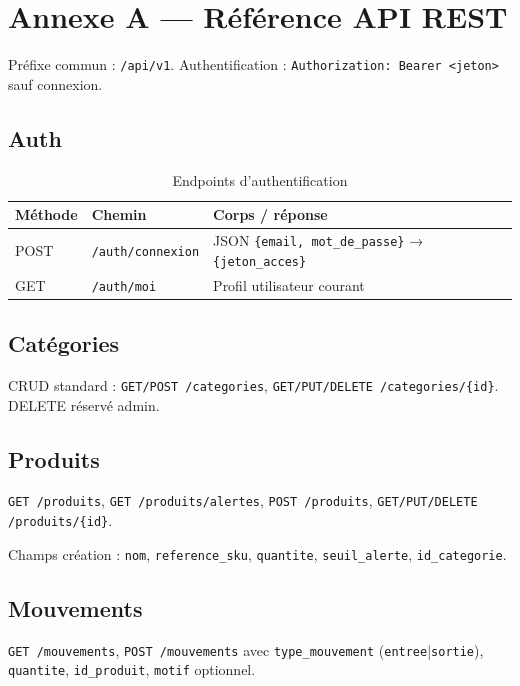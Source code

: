 \chapter{Annexe A — Référence API REST}
\label{ann:api}

Préfixe commun : \texttt{/api/v1}. Authentification : \texttt{Authorization: Bearer <jeton>} sauf connexion.

\section{Auth}

\begin{table}[htbp]
  \centering
  \caption{Endpoints d'authentification}
  \label{tab:api-auth}
  \small
  \begin{tabular}{@{}llp{6cm}@{}}
    \toprule
    \textbf{Méthode} & \textbf{Chemin} & \textbf{Corps / réponse} \\
    \midrule
    POST & \texttt{/auth/connexion} & JSON \texttt{\{email, mot\_de\_passe\}} → \texttt{\{jeton\_acces\}} \\
    GET & \texttt{/auth/moi} & Profil utilisateur courant \\
    \bottomrule
  \end{tabular}
\end{table}

\section{Catégories}

CRUD standard : \texttt{GET/POST /categories}, \texttt{GET/PUT/DELETE /categories/\{id\}}. DELETE réservé admin.

\section{Produits}

\texttt{GET /produits}, \texttt{GET /produits/alertes}, \texttt{POST /produits}, \texttt{GET/PUT/DELETE /produits/\{id\}}.

Champs création : \texttt{nom}, \texttt{reference\_sku}, \texttt{quantite}, \texttt{seuil\_alerte}, \texttt{id\_categorie}.

\section{Mouvements}

\texttt{GET /mouvements}, \texttt{POST /mouvements} avec \texttt{type\_mouvement} (\texttt{entree}|\texttt{sortie}), \texttt{quantite}, \texttt{id\_produit}, \texttt{motif} optionnel.

